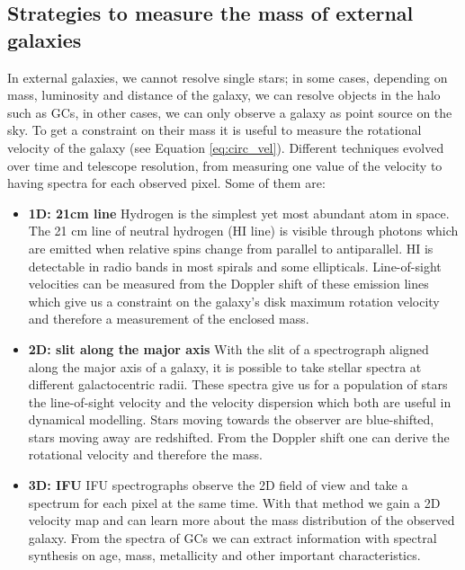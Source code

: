 \subsection{Strategies to measure the mass of external galaxies}\label{subsec:mass_est_ext}
In external galaxies, we cannot resolve single stars; in some cases, depending on mass, luminosity and distance of the galaxy, we can resolve objects in the halo such as \acp{GC}, in other cases, we can only observe a galaxy as point source on the sky. To get a constraint on their mass it is useful to measure the rotational velocity of the galaxy (see Equation \ref{eq:circ_vel}). Different techniques evolved over time and telescope resolution, from measuring one value of the velocity to having spectra for each observed pixel. Some of them are:
\begin{itemize}
    \item\textbf{1D: 21cm line} Hydrogen is the simplest yet most abundant atom in space. The 21 cm line of neutral hydrogen (HI line) is visible through photons which are emitted when relative spins change from parallel to antiparallel. HI is detectable in radio bands in most spirals and some ellipticals. Line-of-sight velocities can be measured from the Doppler shift of these emission lines which give us a constraint on the galaxy's disk maximum rotation velocity and therefore a measurement of the enclosed mass.
    \item\textbf{2D: slit along the major axis} With the slit of a spectrograph aligned along the major axis of a galaxy, it is possible to take stellar spectra at different galactocentric radii. These spectra give us for a population of stars the line-of-sight velocity and the velocity dispersion which both are useful in dynamical modelling. Stars moving towards the observer are blue-shifted, stars moving away are redshifted. From the Doppler shift one can derive the rotational velocity and therefore the mass. 
    \item \textbf{3D: \acl{IFU}} \ac{IFU} spectrographs observe the 2D field of view and take a spectrum for each pixel at the same time. With that method we gain a 2D velocity map and can learn more about the mass distribution of the observed galaxy. From the spectra of \acp{GC} we can extract information with spectral synthesis on age, mass, metallicity and other important characteristics. 

\end{itemize}

